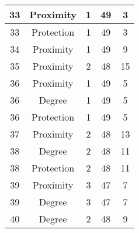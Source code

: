 \documentclass[results.tex]{subfiles}
\begin{document}
\begin{center}
\begin{tabular}{| c || c | c | c | c |}
            \hline
            33                      & Proximity                    & 1                      & 49                      & 3                    \\
            \hline
            33                      & Protection                   & 1                      & 49                      & 3                    \\
            \hline
            34                      & Proximity                    & 1                      & 49                      & 9                    \\
            \hline
            35                      & Proximity                    & 2                      & 48                      & 15                   \\
            \hline
            36                      & Proximity                    & 1                      & 49                      & 5                    \\
            \hline
            36                      & Degree                       & 1                      & 49                      & 5                    \\
            \hline
            36                      & Protection                   & 1                      & 49                      & 5                    \\
            \hline
            37                      & Proximity                    & 2                      & 48                      & 13                   \\
            \hline
            38                      & Degree                       & 2                      & 48                      & 11                   \\
            \hline
            38                      & Protection                   & 2                      & 48                      & 11                   \\
            \hline
            39                      & Proximity                    & 3                      & 47                      & 7                    \\
            \hline
            39                      & Degree                       & 3                      & 47                      & 7                    \\
            \hline
            40                      & Degree                       & 2                      & 48                      & 9                    \\

\end{tabular}
\end{center}
\end{document}
